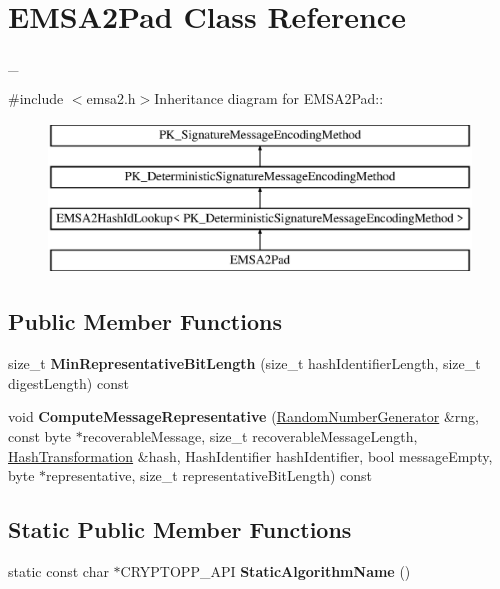 \hypertarget{class_e_m_s_a2_pad}{
\section{EMSA2Pad Class Reference}
\label{class_e_m_s_a2_pad}
}


\_\-  


{\ttfamily \#include $<$emsa2.h$>$}Inheritance diagram for EMSA2Pad::\begin{figure}[H]
\begin{center}
\leavevmode
\includegraphics[height=4cm]{class_e_m_s_a2_pad}
\end{center}
\end{figure}
\subsection*{Public Member Functions}
\begin{DoxyCompactItemize}
\item 
\hypertarget{class_e_m_s_a2_pad_a11897dbdc884ef521c02bc0decd7d14f}{
size\_\-t {\bfseries MinRepresentativeBitLength} (size\_\-t hashIdentifierLength, size\_\-t digestLength) const }
\label{class_e_m_s_a2_pad_a11897dbdc884ef521c02bc0decd7d14f}

\item 
\hypertarget{class_e_m_s_a2_pad_a1e5129986bcf985f6482832afdb34fff}{
void {\bfseries ComputeMessageRepresentative} (\hyperlink{class_random_number_generator}{RandomNumberGenerator} \&rng, const byte $\ast$recoverableMessage, size\_\-t recoverableMessageLength, \hyperlink{class_hash_transformation}{HashTransformation} \&hash, HashIdentifier hashIdentifier, bool messageEmpty, byte $\ast$representative, size\_\-t representativeBitLength) const }
\label{class_e_m_s_a2_pad_a1e5129986bcf985f6482832afdb34fff}

\end{DoxyCompactItemize}
\subsection*{Static Public Member Functions}
\begin{DoxyCompactItemize}
\item 
\hypertarget{class_e_m_s_a2_pad_ad69fe09443956a33e9b4ea9c131e8e77}{
static const char $\ast$CRYPTOPP\_\-API {\bfseries StaticAlgorithmName} ()}
\label{class_e_m_s_a2_pad_ad69fe09443956a33e9b4ea9c131e8e77}

\end{DoxyCompactItemize}


